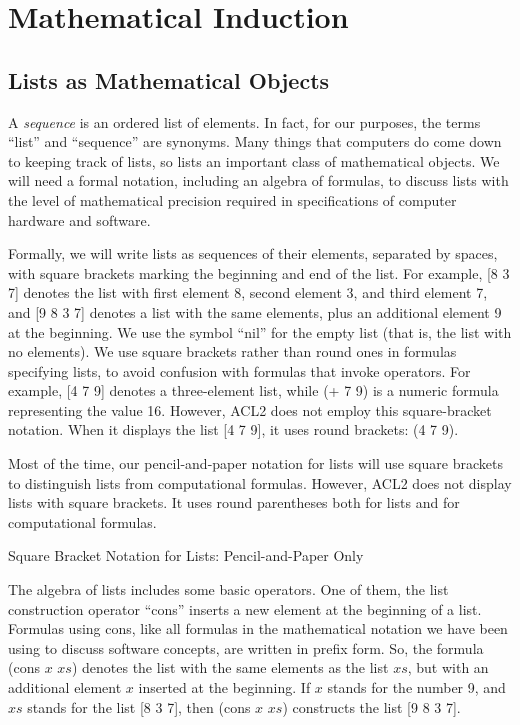 \chapter{Mathematical Induction}
\label{ch:mathematical-induction}

\section{Lists as Mathematical Objects}
\label{sec:lists-as-obj}
A \emph{sequence}
is an ordered list of elements.
In fact, for our purposes, the terms ``list'' and ``sequence'' are synonyms.
Many things that computers do come down to keeping track of lists,
so lists an important class of mathematical objects.
We will need a formal notation, including an algebra of formulas,
to discuss lists with the level of mathematical precision
required in specifications of computer hardware and software.

Formally, we will write lists as sequences of their elements, separated by spaces,
with square brackets marking the beginning and end of the list.
For example, [8 3 7] denotes the list with first element 8,
second element 3, and third element 7, and
[9 8 3 7] denotes a list with the same elements,
plus an additional element 9 at the beginning.
\label{nil-def}
We use the symbol ``nil'' for the empty list
(that is, the list with no elements).
\label{square-brackets}
We use square brackets
rather than round ones in formulas
specifying lists, to avoid confusion with formulas that invoke operators.
For example, [4 7 9] denotes a three-element list,
while (+ 7 9) is a numeric formula representing the value 16.
However, ACL2 does not employ this square-bracket notation.
When it displays the list [4 7 9],
it uses round brackets: (4 7 9).

\begin{aside}
Most of the time, our pencil-and-paper notation for lists
will use square brackets to distinguish lists from computational formulas.
However, ACL2 does not display lists with square brackets.
It uses round parentheses both for lists and for computational formulas.
\caption{Square Bracket Notation for Lists: Pencil-and-Paper Only}
\label{square-bracket-notation}
\end{aside}

The algebra of lists includes some basic operators.
One of them, the
list construction 
operator ``cons''
inserts a new element at the beginning of a list.
Formulas using cons, like all formulas in
the mathematical notation we have been using to discuss software concepts,
are written in prefix form.
So, the formula (cons $x$ $xs$) denotes the list
with the same elements as the list $xs$,
but with an additional element $x$ inserted at the beginning.
If $x$ stands for the number 9,
and $xs$ stands for the list [8 3 7],
then (cons $x$ $xs$) constructs the list [9 8 3 7].

